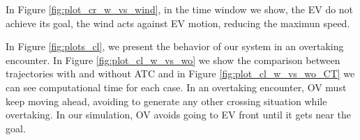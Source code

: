         
         
        In Figure \ref{fig:plot_cr_w_vs_wind}, in the time window we show, the \ac{EV} do not achieve its goal, the wind acts against \ac{EV} motion, reducing the maximun speed.
          
        In Figure \ref{fig:plots_cl}, we present the behavior of our system in an overtaking encounter. In Figure \ref{fig:plot_cl_w_vs_wo} we show the comparison between trajectories with and without \ac{ATC} and in Figure \ref{fig:plot_cl_w_vs_wo_CT} we can see computational time for each case. In an overtaking encounter, \ac{OV} must keep moving ahead, avoiding to generate any other crossing situation while overtaking. In our simulation, \ac{OV} avoids going to \ac{EV} front until it gets near the goal.
        
